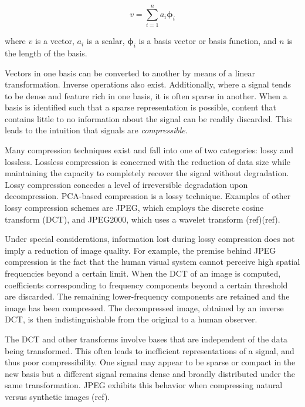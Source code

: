 \documentclass[conference]{IEEEtran}
\begin{document}
    \begin{equation}
        v = \sum_{i=1}^{n} a_i \mathbf{\phi}_{i}
    \label{eq:basisdef}
    \end{equation}

    where $v$ is a vector, $a_i$ is a scalar, $\mathbf{\phi}_{i}$ is a basis vector or basis function, and $n$ is the length of the basis.

    Vectors in one basis can be converted to another by means of a linear transformation. Inverse operations also exist. Additionally, where a signal tends to be dense and feature rich in one basis, it is often sparse in another. When a basis is identified such that a sparse representation is possible, content that contains little to no information about the signal can be readily discarded. This leads to the intuition that signals are \textit{compressible}.

    Many compression techniques exist and fall into one of two categories: lossy and lossless. Lossless compression is concerned with the reduction of data size while maintaining the capacity to  completely recover the signal without degradation. Lossy compression concedes a level of irreversible degradation upon decompression. PCA-based compression is a lossy technique. Examples of other lossy compression schemes are JPEG, which employs the discrete cosine transform (DCT), and JPEG2000, which uses a wavelet transform (ref)(ref).
    
    Under special considerations, information lost during lossy compression does not imply a reduction of image quality. For example, the premise behind JPEG compression is the fact that the human visual 
    system cannot perceive high spatial frequencies beyond a certain limit. When the DCT of an image is computed, coefficients corresponding to frequency components beyond a certain threshold are discarded. The remaining lower-frequency components are retained and the image has been compressed. The decompressed image, obtained by an inverse DCT, is then indistinguishable from the original to a human observer.

    The DCT and other transforms involve bases that are independent of the data being transformed. This often leads to inefficient representations of a signal, and thus poor compressibility. One signal may appear to be sparse or compact in the new basis but a different signal remains dense and broadly distributed under the same transformation. JPEG exhibits this behavior when compressing natural versus synthetic images (ref).
    
\end{document}
